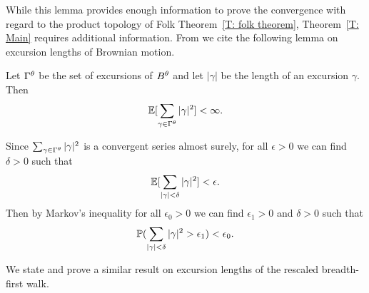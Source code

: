 While this lemma provides enough information to prove the convergence with regard to the product topology of Folk Theorem~\ref{T: folk theorem},
Theorem~\ref{T: Main} requires additional information.
From \cite[Lemma 25, p.843]{Aldous.1997} we cite the following lemma on excursion lengths of Brownian motion.
\begin{lemma} \label{L: BM in ld}
	Let $\Gamma^{\theta}$ be the set of excursions of $B^{\theta}$ and let $|\gamma|$ be the length of an excursion $\gamma$.
	Then
	\begin{equation}
		\mathbb{E}[\sum_{\gamma \in \Gamma^{\theta}} |\gamma|^2] < \infty.
	\end{equation}
\end{lemma}

Since $\sum_{\gamma \in \Gamma^{\theta}} |\gamma|^2$ is a convergent series almost surely,
for all $\epsilon > 0$ we can find $\delta > 0$ such that
\begin{equation}
	\mathbb{E}[\sum_{|\gamma| < \delta} |\gamma|^2] < \epsilon.
\end{equation}
Then by Markov's inequality for all $\epsilon_0 > 0$ we can find $\epsilon_1 > 0$ and $\delta > 0$ such that
\begin{equation} \label{E: sum gamma < delta}
	\mathbb{P}(\sum_{|\gamma| < \delta} |\gamma|^2 > \epsilon_1) < \epsilon_0.
\end{equation}

We state and prove a similar result on excursion lengths of the rescaled breadth-first walk.

